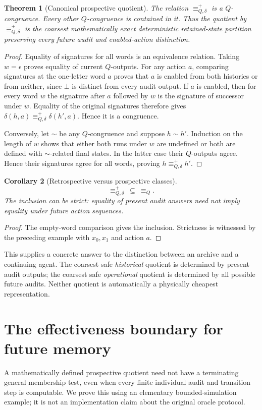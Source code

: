 \documentclass[11pt,letterpaper]{article}
\newtheorem{theorem}{Theorem}[section]
\newtheorem{corollary}[theorem]{Corollary}
\theoremstyle{definition}
\begin{document}
\begin{theorem}[Canonical prospective quotient]\label{thm:future}
The relation $\equiv_{Q,\delta}^{+}$ is a $Q$-congruence. Every other $Q$-congruence is contained in it. Thus the quotient by $\equiv_{Q,\delta}^{+}$ is the coarsest \emph{mathematically exact} deterministic retained-state partition preserving every future audit and enabled-action distinction.
\end{theorem}
\begin{proof}
Equality of signatures for all words is an equivalence relation. Taking $w=\epsilon$ proves equality of current $Q$-outputs. For any action $a$, comparing signatures at the one-letter word $a$ proves that $a$ is enabled from both histories or from neither, since $\bot$ is distinct from every audit output. If $a$ is enabled, then for every word $w$ the signature after $a$ followed by $w$ is the signature of successor under $w$. Equality of the original signatures therefore gives $\delta(h,a)\equiv_{Q,\delta}^{+}\delta(h',a)$. Hence it is a congruence.

Conversely, let $\sim$ be any $Q$-congruence and suppose $h\sim h'$. Induction on the length of $w$ shows that either both runs under $w$ are undefined or both are defined with $\sim$-related final states. In the latter case their $Q$-outputs agree. Hence their signatures agree for all words, proving $h\equiv_{Q,\delta}^{+}h'$.
\end{proof}

\begin{corollary}[Retrospective versus prospective classes]
\[
\equiv_{Q,\delta}^{+}\ \subseteq\ \equiv_Q.
\]
The inclusion can be strict: equality of present audit answers need not imply equality under future action sequences.
\end{corollary}
\begin{proof}
The empty-word comparison gives the inclusion. Strictness is witnessed by the preceding example with $x_0,x_1$ and action $a$.
\end{proof}

This supplies a concrete answer to the distinction between an archive and a continuing agent. The coarsest safe \emph{historical} quotient is determined by present audit outputs; the coarsest safe \emph{operational} quotient is determined by all possible future audits. Neither quotient is automatically a physically cheapest representation.

\section{The effectiveness boundary for future memory}
A mathematically defined prospective quotient need not have a terminating general membership test, even when every finite individual audit and transition step is computable. We prove this using an elementary bounded-simulation example; it is not an implementation claim about the original oracle protocol.
\end{document}
